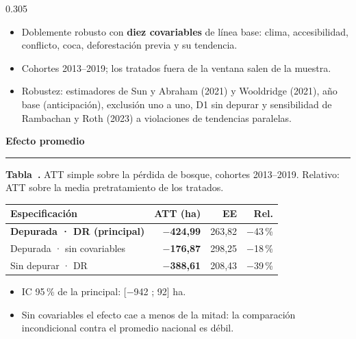 \documentclass[final,t]{beamer}
\newcommand{\seccion}[2]{%
  \par\vspace{0.5\baselineskip}%
  {\color{dosel}\Large\bfseries #1\hfill{\color{tenue}\normalsize\mdseries #2}}\par
  \vspace{-0.35\baselineskip}%
  {\color{dosel}\rule{\linewidth}{2.2pt}}\par
  \vspace{0.25\baselineskip}%
}
\newcommand{\nota}[1]{{\color{tenue}\small #1\par}}
\newcounter{tabposter}
\newcommand{\tabcap}[2]{\refstepcounter{tabposter}\label{#1}%
  \nota{\textbf{Tabla~\thetabposter.} #2}}
\begin{document}
\begin{frame}[t]{}
\begin{columns}[t]
\begin{column}{0.305\paperwidth}
\begin{itemize}
  \item Doblemente robusto con \textbf{diez covariables} de línea base: clima, accesibilidad,
        conflicto, coca, deforestación previa y su tendencia.
  \item Cohortes 2013--2019; los tratados fuera de la ventana salen de la muestra.
  \item Robustez: estimadores de Sun y Abraham (2021) y Wooldridge (2021), año base
        (anticipación), exclusión uno a uno, D1 sin depurar y sensibilidad de Rambachan y Roth (2023) a violaciones de tendencias paralelas.
\end{itemize}

\seccion{Efecto promedio}{}
\tabcap{tab:att}{ATT simple sobre la pérdida de bosque, cohortes 2013--2019. Relativo: ATT sobre
la media pretratamiento de los tratados.}
\begin{center}
\begin{tabularx}{\linewidth}{Xrrr}
\toprule
\rowcolor{dosel}
\textcolor{papel}{\textbf{Especificación}} & \textcolor{papel}{\textbf{ATT (ha)}} &
\textcolor{papel}{\textbf{EE}} & \textcolor{papel}{\textbf{Rel.}}\\
\midrule
\rowcolor{orofondo}
\textbf{Depurada · DR (principal)} & \textcolor{reduccion}{\textbf{$-$424,99}} & 263,82 & $-$43\,\%\\
Depurada · sin covariables & \textcolor{reduccion}{\textbf{$-$176,87}} & 298,25 & $-$18\,\%\\
Sin depurar · DR           & \textcolor{reduccion}{\textbf{$-$388,61}} & 208,43 & $-$39\,\%\\
\bottomrule
\end{tabularx}
\end{center}
\begin{itemize}
  \item IC 95\,\% de la principal: [$-$942 ; 92] ha.
  \item[\textcolor{brasa}{\rule{0.45ex}{0.45ex}}] Sin covariables el efecto cae a menos de la mitad:
        la comparación incondicional contra el promedio nacional es débil.
\end{itemize}


\end{column}
\end{columns}
\end{frame}
\end{document}
